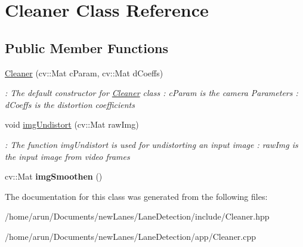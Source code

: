 \hypertarget{classCleaner}{}\section{Cleaner Class Reference}
\label{classCleaner}
\subsection*{Public Member Functions}
\begin{DoxyCompactItemize}
\item 
\hyperlink{classCleaner_ac6641bf42efa5662d4bd259730e33cf8}{Cleaner} (cv\+::\+Mat c\+Param, cv\+::\+Mat d\+Coeffs)\hypertarget{classCleaner_ac6641bf42efa5662d4bd259730e33cf8}{}\label{classCleaner_ac6641bf42efa5662d4bd259730e33cf8}

\begin{DoxyCompactList}\small\item\em \+: The default constructor for \hyperlink{classCleaner}{Cleaner} class  \+: c\+Param is the camera Parameters  \+: d\+Coeffs is the distortion coefficients \end{DoxyCompactList}\item 
void \hyperlink{classCleaner_a6f8ec2c89ddae5fe1c6475da401c9191}{img\+Undistort} (cv\+::\+Mat raw\+Img)\hypertarget{classCleaner_a6f8ec2c89ddae5fe1c6475da401c9191}{}\label{classCleaner_a6f8ec2c89ddae5fe1c6475da401c9191}

\begin{DoxyCompactList}\small\item\em \+: The function img\+Undistort is used for undistorting an input image  \+: raw\+Img is the input image from video frames \end{DoxyCompactList}\item 
cv\+::\+Mat {\bfseries img\+Smoothen} ()\hypertarget{classCleaner_a7d1dab3bb484d1a9c2f3ebc7914a234a}{}\label{classCleaner_a7d1dab3bb484d1a9c2f3ebc7914a234a}

\end{DoxyCompactItemize}


The documentation for this class was generated from the following files\+:\begin{DoxyCompactItemize}
\item 
/home/arun/\+Documents/new\+Lanes/\+Lane\+Detection/include/Cleaner.\+hpp\item 
/home/arun/\+Documents/new\+Lanes/\+Lane\+Detection/app/Cleaner.\+cpp\end{DoxyCompactItemize}
